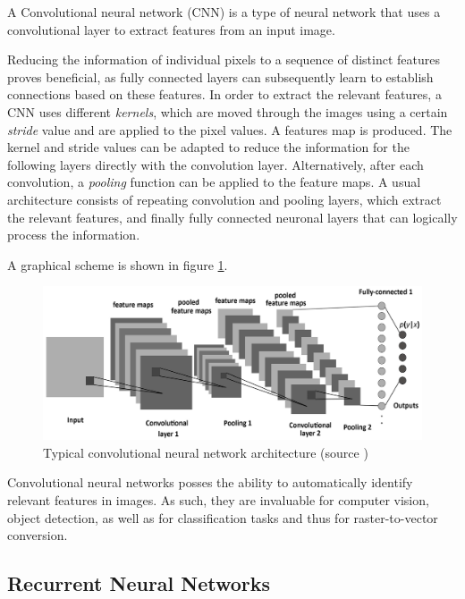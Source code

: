 \documentclass[12pt, a4paper, titlepage]{report}
\begin{document}
A Convolutional neural network (CNN) is a type of neural network that uses a convolutional layer to extract features from an input image. 

Reducing the information of individual pixels to a sequence of distinct features proves beneficial, as fully connected layers can subsequently learn to establish connections based on these features. In order to extract the relevant features, a CNN uses different \emph{kernels}, which are moved through the images using a certain \emph{stride} value and are applied to the pixel values. A features map is produced. The kernel and stride values can be adapted to reduce the information for the following layers directly with the convolution layer.
Alternatively, after each convolution, a \emph{pooling} function can be applied to the feature maps. A usual architecture consists of repeating convolution and pooling layers, which extract the relevant features, and finally fully connected neuronal layers that can logically process the information.

A graphical scheme is shown in figure \ref{fig:cnn_architecture}.

\begin{figure}[h]
	\centering
	\includegraphics[width=1.0\textwidth]{../rc/images/cnn_architecture.png}
   \caption{Typical convolutional neural network architecture (source \cite{img_cnn_architecture})}
	\label{fig:cnn_architecture}
\end{figure}


Convolutional neural networks posses the ability to automatically identify relevant features in images. As such, they are invaluable for computer vision, object detection, as well as for classification tasks and thus for raster-to-vector conversion.


\subsection{Recurrent Neural Networks}
\end{document}
